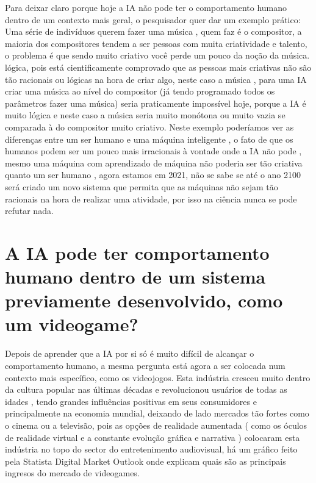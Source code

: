 \documentclass[a4paper]{report}
\begin{document}
Para deixar claro porque hoje a \ac{IA} não pode ter o comportamento humano dentro de um contexto mais geral, o pesquisador quer dar um exemplo prático:
Uma série de indivíduos querem fazer uma música , quem faz é o compositor, a maioria dos compositores tendem a ser pessoas com muita criatividade e talento, o problema é que sendo muito criativo você perde um pouco da noção da música. lógica, pois está cientificamente comprovado que as pessoas mais criativas não são tão racionais ou lógicas na hora de criar algo, neste caso a música , para uma \ac{IA} criar uma música ao nível do compositor (já tendo programado todos os parâmetros fazer uma música) seria praticamente impossível hoje, porque a \ac{IA} é muito lógica e neste caso a música  seria muito monótona ou muito vazia se comparada à do compositor muito criativo.
Neste exemplo poderíamos ver as diferenças entre um ser humano e uma máquina inteligente , o fato de que os humanos podem ser um pouco mais irracionais à vontade onde a \ac{IA} não pode , mesmo uma máquina com aprendizado de máquina não poderia ser tão criativa quanto um ser humano , agora estamos em 2021, não se sabe se até o ano 2100 será criado um novo sistema que permita que as máquinas não sejam tão racionais na hora de realizar uma atividade, por isso na ciência nunca se pode refutar nada.




\chapter{A \ac{IA} pode ter comportamento humano dentro de um sistema previamente desenvolvido, como um videogame?}\cite{ia1}

Depois de aprender que a \ac{IA} por si só é muito difícil  de alcançar o comportamento humano, a mesma pergunta está agora a ser colocada num contexto mais específico, como os videojogos. Esta indústria cresceu muito dentro da cultura popular nas últimas décadas e revolucionou usuários de todas as idades , tendo grandes influências positivas em seus consumidores e principalmente na economia mundial, deixando de lado mercados tão fortes como o cinema ou a televisão, pois as opções de realidade aumentada ( como os óculos de realidade virtual e a constante evolução gráfica e narrativa ) colocaram esta indústria no topo do sector do entretenimento audiovisual, há um gráfico feito pela Statista Digital Market Outlook onde explicam quais são as principais ingresos do mercado de videogames.\\ 
\end{document}
